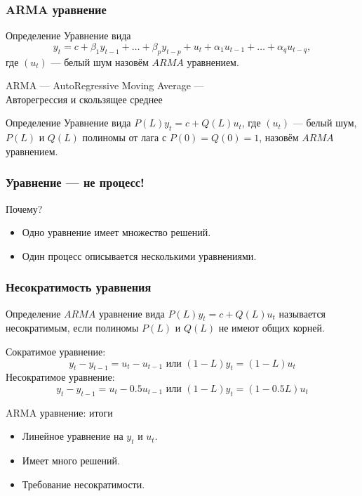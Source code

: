 \begin{frame}
  \frametitle{ARMA уравнение}

  \begin{block}{Определение}
    Уравнение вида
    \[
      y_t = c + \beta_1 y_{t-1} + \ldots + \beta_p y_{t-p} + u_t + \alpha_1 u_{t-1} + \ldots + \alpha_q u_{t-q},
    \]
    где $(u_t)$ — белый шум назовём $ARMA$ уравнением. 
    
    \alert{ARMA — AutoRegressive Moving Average — \\
    Авторегрессия и скользящее среднее}
  \end{block}
  

  \pause
  \begin{block}{Определение}
    Уравнение вида $P(L) y_t = c + Q(L) u_t$, 
    где $(u_t)$ — белый шум, $P(L)$ и $Q(L)$ полиномы от лага с $P(0)=Q(0)=1$, назовём $ARMA$ уравнением.   
  \end{block}

\end{frame}

\begin{frame}
  \frametitle{Уравнение — не процесс!}

  Почему?
  \begin{itemize}[<+->]
    \item Одно уравнение имеет \alert{множество решений}.
    \item Один процесс описывается \alert{несколькими уравнениями}. 
  \end{itemize}  

\end{frame}


\begin{frame}
  \frametitle{Несократимость уравнения}

  \begin{block}{Определение}
    $ARMA$ уравнение вида $P(L) y_t = c + Q(L) u_t$ называется \alert{несократимым}, 
    если полиномы $P(L)$ и $Q(L)$ не имеют общих корней. 
  \end{block}

  \pause 
  Сократимое уравнение:
  \[
   y_t - y_{t-1} = u_t - u_{t-1}     \text{ или } (1- L)y_t = (1 - L)u_t
  \]
  \pause
  Несократимое уравнение:
  \[
   y_t - y_{t-1} = u_t - 0.5u_{t-1}     \text{ или } (1- L)y_t = (1 - 0.5L)u_t
  \]

\end{frame}




\begin{frame}{ARMA уравнение: итоги}

  \begin{itemize}[<+->]
    \item Линейное уравнение на $y_t$ и $u_t$.
    \item Имеет много решений. 
    \item Требование несократимости. 
  \end{itemize}
\end{frame}

